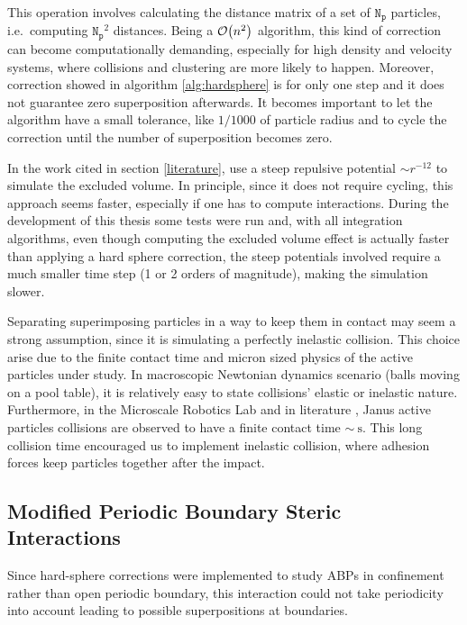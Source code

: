 \documentclass[../../master_thesis_np.tex]{subfiles}
\begin{document}
	This operation involves calculating the distance matrix of a set of $\mathtt{N_p}$ particles, i.e.\ computing $\mathtt{N_p}^2$ distances.
	Being a $\order{n^2}$ algorithm, this kind of correction can become computationally demanding, especially for high density and velocity systems, where collisions and clustering are more likely to happen. 
	Moreover, correction showed in algorithm \ref{alg:hardsphere} is for only one step and it does not guarantee zero superposition afterwards.
	It becomes important to let the algorithm have a small tolerance, like $1/1000$ of particle radius and to cycle the correction until the number of superposition becomes zero.
	
	In the work cited in section \ref{literature}, \citeauthor{martin-gomez_collective_2018} use a steep repulsive potential $\sim r^{-12}$ to simulate the excluded volume.
	In principle, since it does not require cycling, this approach seems faster, especially if one has to compute interactions.
	During the development of this thesis some tests were run and, with all integration algorithms, even though computing the excluded volume effect is actually faster than applying a hard sphere correction, the steep potentials involved require a much smaller time step (1 or 2 orders of magnitude), making the simulation slower.
	
	Separating superimposing particles in a way to keep them in contact may seem a strong assumption, since it is simulating a perfectly inelastic collision.
	This choice arise due to the finite contact time and micron sized physics of the active particles under study.
	In macroscopic Newtonian dynamics scenario (balls moving on a pool table), it is relatively easy to state collisions' elastic or inelastic nature.
	Furthermore, in the Microscale Robotics Lab and in literature \cite{singh_pair_2024}, Janus active particles collisions are observed to have a finite contact time $\sim\SI{}{\second}$.
	This long collision time encouraged us to implement inelastic collision, where adhesion forces keep particles together after the impact.
	
	\subsection{Modified Periodic Boundary Steric Interactions}
	Since hard-sphere corrections were implemented to study ABPs in confinement rather than open periodic boundary, this interaction could not take periodicity into account leading to possible superpositions at boundaries.
	
\end{document}

